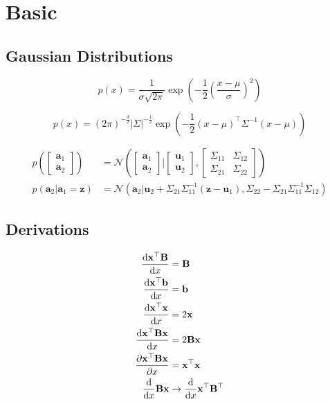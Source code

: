 \section{Basic}

\subsection{Gaussian Distributions}

$$p(x) = \frac{1}{\sigma \sqrt{2\pi}}\exp\left(-\frac{1}{2}\left(\frac{x-\mu}{\sigma}\right)^2\right)$$

$$p(x) = (2\pi)^{-\frac{d}{2}} \left|\Sigma\right|^{-\frac{1}{2}}\exp \left(-\frac{1}{2}(x-\mu)^\intercal\Sigma^{-1}(x-\mu)\right)$$

\begin{align*}
p\left(
\begin{bmatrix}
\mathbf a_1\\
\mathbf a_2
\end{bmatrix}
\right)
&=\mathcal N\left(
\begin{bmatrix}
\mathbf a_1\\
\mathbf a_2
\end{bmatrix}|
\begin{bmatrix}
\mathbf u_1\\
\mathbf u_2
\end{bmatrix},
\begin{bmatrix}
\Sigma_{11} & \Sigma_{12}\\
\Sigma_{21}& \Sigma_{22}
\end{bmatrix}
\right)\\
p(\mathbf a_2|\mathbf a_1=\mathbf z)&=\mathcal N\left(\mathbf a_2 | \mathbf u_2 + \Sigma_{21}\Sigma_{11}^{-1}(\mathbf z-\mathbf u_1), \Sigma_{22}-\Sigma_{21}\Sigma_{11}^{-1}\Sigma_{12}\right)
\end{align*}

\subsection{Derivations}

\begin{align*}
\frac {\text{d}\mathbf x^\top \mathbf B} {\text{d}x} &= \mathbf B\\
\frac {\text{d}\mathbf x^\top \mathbf b} {\text{d}x} &= \mathbf b\\
\frac {\text{d}\mathbf x^\top \mathbf x} {\text{d}x} &= 2 \mathbf x\\
\frac {\text{d}\mathbf x^\top \mathbf B \mathbf x} {\text{d}x} &= 2 \mathbf {Bx}\\
\frac {\partial\mathbf x^\top \mathbf B \mathbf x} {\partial x} &= \mathbf x^\top \mathbf x\\
\frac {\text{d}} {\text{d}x} \mathbf B \mathbf x &\rightarrow \frac{\text d}{\text dx} \mathbf x^\top \mathbf B^\top\\
\end{align*}

